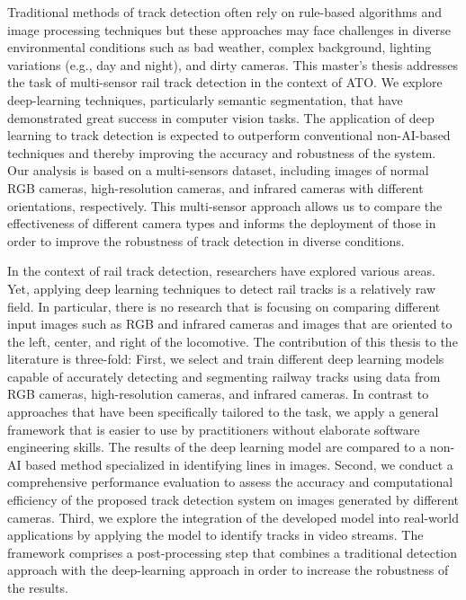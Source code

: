 \documentclass[Master,MDS,english]{BASE/twbook} %
\begin{document}
Traditional methods of track detection often rely on rule-based algorithms and image processing techniques but these approaches may face challenges in diverse environmental conditions such as bad weather, complex background, lighting variations (e.g., day and night), and dirty cameras.
This master's thesis addresses the task of multi-sensor rail track detection in the context of ATO. We explore deep-learning techniques, particularly semantic segmentation, that have demonstrated great success in computer vision tasks. The application of deep learning to track detection is expected to outperform conventional non-AI-based techniques and thereby improving the accuracy and robustness of the system.
Our analysis is based on a multi-sensors dataset, including images of normal RGB cameras, high-resolution cameras, and infrared cameras with different orientations, respectively. This multi-sensor approach allows us to compare the effectiveness of different camera types and informs the deployment of those in order to improve the robustness of track detection in diverse conditions. 

In the context of rail track detection, researchers have explored various areas. Yet, applying deep learning techniques to detect rail tracks is a relatively raw field. In particular, there is no research that is focusing on comparing different input images such as RGB and infrared cameras and images that are oriented to the left, center, and right of the locomotive. 
The contribution of this thesis to the literature is three-fold: First, we select and train different deep learning models capable of accurately detecting and segmenting railway tracks using data from RGB cameras, high-resolution cameras, and infrared cameras. In contrast to approaches that have been specifically tailored to the task, we apply a general framework that is easier to use by practitioners without elaborate software engineering skills.
The results of the deep learning model are compared to a non-AI based method specialized in identifying lines in images. 
Second, we conduct a comprehensive performance evaluation to assess the accuracy and computational efficiency of the proposed track detection system on images generated by different cameras.
Third, we explore the integration of the developed model into real-world applications by applying the model to identify tracks in video streams. The framework comprises a post-processing step  that combines a traditional detection approach with the deep-learning approach in order to increase the robustness of the results. 
\end{document}
